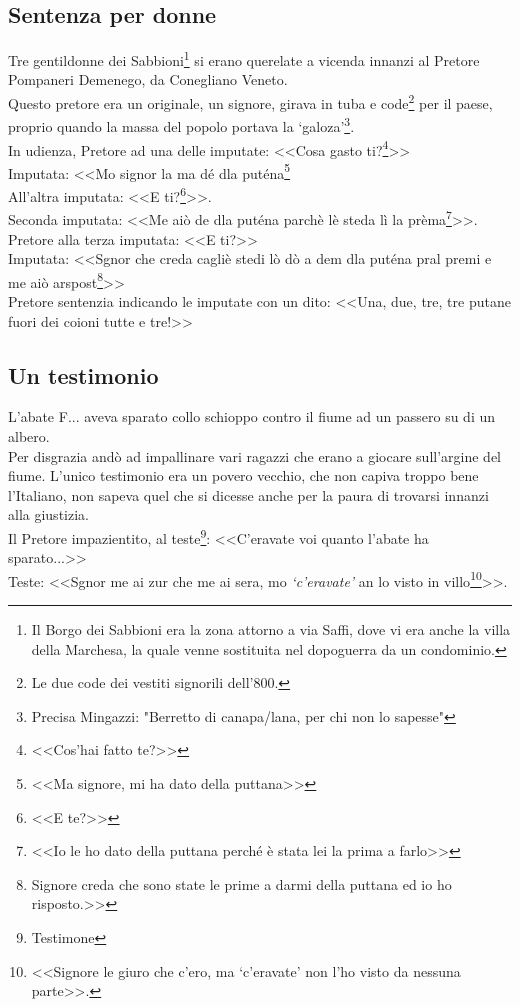 \subsection{Sentenza per donne}
Tre gentildonne dei Sabbioni\footnote{Il Borgo dei Sabbioni era la zona attorno a via Saffi, dove vi era anche la villa della Marchesa, la quale venne sostituita nel dopoguerra da un condominio.} si erano querelate a vicenda innanzi al Pretore Pompaneri Demenego, da Conegliano Veneto.\\
\indent Questo pretore era un originale, un signore, girava in tuba e code\footnote{Le due code dei vestiti signorili dell'800.} per il paese, proprio quando la massa del popolo portava la `galoza'\footnote{Precisa Mingazzi: "Berretto di canapa/lana, per chi non lo sapesse"}.\\
\indent In udienza, Pretore ad una delle imputate: <<Cosa gasto ti?\footnote{<<Cos'hai fatto te?>>}>>\\
\indent Imputata: <<Mo signor la ma dé dla puténa\footnote{<<Ma signore, mi ha dato della puttana>>}\\
\indent All'altra imputata: <<E ti?\footnote{<<E te?>>}>>.\\
\indent Seconda imputata: <<Me aiò de dla puténa parchè lè steda lì la prèma\footnote{<<Io le ho dato della puttana perché è stata lei la prima a farlo>>}>>.\\
\indent Pretore alla terza imputata: <<E ti?>>\\
\indent Imputata: <<Sgnor che creda cagliè stedi lò dò a dem dla puténa pral premi e me aiò arspost\footnote{Signore creda che sono state le prime a darmi della puttana ed io ho risposto.>>}>>\\
\indent Pretore sentenzia indicando le imputate con un dito: <<Una, due, tre, tre putane fuori dei coioni tutte e tre!>>

\subsection{Un testimonio}
L'abate F\:.\:.\:. aveva sparato collo schioppo contro il fiume ad un passero su di un albero.\\
\indent Per disgrazia andò ad impallinare vari ragazzi che erano a giocare sull'argine del fiume. L'unico testimonio era un povero vecchio, che non capiva troppo bene l'Italiano, non sapeva quel che si dicesse anche per la paura di trovarsi innanzi alla giustizia.	\\
\indent Il Pretore impazientito, al teste\footnote{Testimone}: <<C'eravate voi quanto l'abate ha sparato...>>\\
\indent Teste: <<Sgnor me ai zur che me ai sera, mo \emph{`c'eravate'} an lo visto in villo\footnote{<<Signore le giuro che c'ero, ma `c'eravate' non l'ho visto da nessuna parte>>.}>>.

